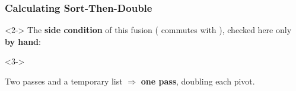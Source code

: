 \begin{frame*}[vertical-alignment = top]
  \frametitle{Calculating Sort-Then-Double}
  \vspace*{4mm}
  \begin{onlyenv}<2->
    The \textbf{side condition} of this fusion ( commutes with
    ), checked here only \textbf{by hand}:
  \end{onlyenv}
  \par
  \begin{onlyenv}<3->
    \begin{center}
      Two passes and a temporary list $\Longrightarrow$ \textbf{one pass},
      doubling each pivot.
    \end{center}
  \end{onlyenv}
  \par
\end{frame*}
